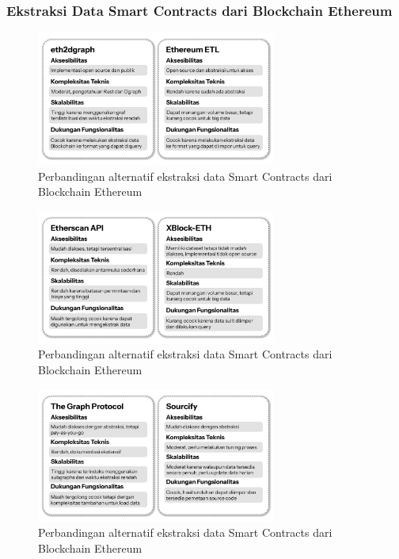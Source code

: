 \subsubsection{Ekstraksi Data Smart Contracts dari Blockchain Ethereum}

\begin{figure}[ht]
	\centering
	\includegraphics[width=0.7\textwidth]{resources/chapter-3/ekstraksi-1.png}
	\caption{Perbandingan alternatif ekstraksi data Smart Contracts dari Blockchain Ethereum}
	\label{image:perbandingan-ekstraksi-1}
\end{figure}

\begin{figure}[ht]
	\centering
	\includegraphics[width=0.7\textwidth]{resources/chapter-3/ekstraksi-2.png}
	\caption{Perbandingan alternatif ekstraksi data Smart Contracts dari Blockchain Ethereum}
	\label{image:perbandingan-ekstraksi-2}
\end{figure}

\begin{figure}[ht]
	\centering
	\includegraphics[width=0.7\textwidth]{resources/chapter-3/ekstraksi-3.png}
	\caption{Perbandingan alternatif ekstraksi data Smart Contracts dari Blockchain Ethereum}
	\label{image:perbandingan-ekstraksi-3}
\end{figure}

